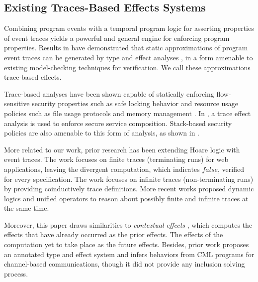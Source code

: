 \documentclass[acmsmall,10pt,review]{acmart}
\newcommand{\code}[1]{{\tt{\ensuremath{\m{#1}}}}}
\newcommand{\m}{\mathit}
\begin{document}
{{{\subsection{Existing Traces-Based Effects Systems} 



Combining program events with a temporal program logic for asserting properties of event traces yields a powerful and general engine for enforcing program properties. Results in \cite{DBLP:journals/jfp/SkalkaSH08,DBLP:conf/aplas/SkalkaS04,DBLP:conf/aplas/MarriottSS03} have demonstrated that static approximations of program event traces can be generated by type and effect analyses \cite{DBLP:journals/iandc/TalpinJ94,DBLP:books/daglib/0098135}, in a form amenable to existing model-checking techniques for verification. We call these approximations trace-based effects.

Trace-based analyses have been shown capable of statically enforcing flow-sensitive security properties such as safe locking behavior \cite{DBLP:conf/pldi/FosterTA02} and resource usage policies such as file usage protocols and memory management \cite{DBLP:conf/aplas/MarriottSS03}. In \cite{DBLP:conf/csfw/BartolettiDF05}, a trace effect analysis is used to enforce secure service composition. 
 Stack-based security policies are also amenable to this form of analysis, as shown in \cite{DBLP:conf/aplas/SkalkaS04}. 
 

 

 
More related to our work, prior research has been extending Hoare logic with event traces. The work \cite{DBLP:journals/jsc/MalechaMW11} focuses on finite traces (terminating runs) for web applications, leaving the divergent computation, which indicates \code{false}, verified for every specification. The work \cite{DBLP:conf/esop/NakataU10} focuses on infinite traces (non-terminating runs) by providing coinductively trace definitions. 
More recent works \cite{DBLP:conf/tableaux/BubelDHN15,DBLP:conf/icfem/SongC20} proposed dynamic logics and unified operators to reason about possibly finite and infinite traces at the same time. 

Moreover, this paper draws similarities to \textit{contextual effects} \cite{DBLP:conf/popl/NeamtiuHFP08}, which computes the effects that have already occurred as the prior effects. The effects of the computation yet to take place as the future effects. 
Besides, prior work \cite{DBLP:conf/fase/NielsonAN98} proposes an annotated type and effect system and infers behaviors from CML \cite{DBLP:conf/mcmaster/Reppy93} programs for channel-based communications, though it did not provide any inclusion solving process. 



}}}
\end{document}

